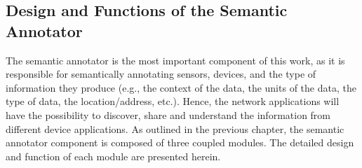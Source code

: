 \begin{table}[htbp]
\centering
{}
\end{table}

\subsection{Design and Functions of the Semantic Annotator}
The semantic annotator is the most important component of this work, as it is responsible for semantically annotating sensors, devices, and the type of information they produce (e.g., the context of the data, the units of the data, the type of data, the location/address, etc.). Hence, the network applications will have the possibility to discover, share and understand the information from different device applications. As outlined in the previous chapter, the semantic annotator component is composed of three coupled modules. The detailed design and function of each module are presented herein.


